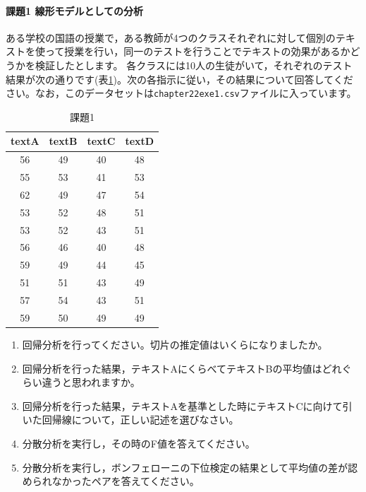 \documentclass{ltjsarticle}
\begin{document}
\paragraph{課題1 線形モデルとしての分析}
ある学校の国語の授業で，ある教師が4つのクラスそれぞれに対して個別のテキストを使って授業を行い，同一のテストを行うことでテキストの効果があるかどうかを検証したとします。
各クラスには10人の生徒がいて，それぞれのテスト結果が次の通りです(表\ref{L23::exe1})。次の各指示に従い，その結果について回答してください。なお，このデータセットは\texttt{chapter22exe1.csv}ファイルに入っています。
\begin{table}[ht]
  \centering

  \caption{課題1}
\begin{tabular}{cccc}
  \hline
  textA & textB & textC & textD\\
  \hline
  56 & 49 & 40 & 48\\
  55 & 53 & 41 & 53\\
  62 & 49 & 47 & 54\\
  53 & 52 & 48 & 51\\
  53 & 52 & 43 & 51\\
  56 & 46 & 40 & 48\\
  59 & 49 & 44 & 45\\
  51 & 51 & 43 & 49\\
  57 & 54 & 43 & 51\\
  59 & 50 & 49 & 49\\
  \hline
  \end{tabular}
  \label{L23::exe1}
\end{table}

\begin{enumerate}
  \item 回帰分析を行ってください。切片の推定値はいくらになりましたか。
  \item 回帰分析を行った結果，テキストAにくらべてテキストBの平均値はどれぐらい違うと思われますか。
  \item 回帰分析を行った結果，テキストAを基準とした時にテキストCに向けて引いた回帰線について，正しい記述を選びなさい。
  \item 分散分析を実行し，その時のF値を答えてください。
  \item 分散分析を実行し，ボンフェローニの下位検定の結果として平均値の差が認められなかったペアを答えてください。
\end{enumerate}
\end{document}
